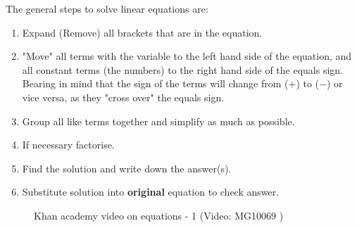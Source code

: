             \label{m39241*id145627}The general steps to solve linear equations are:\par 
        \label{m39241*id145635}\begin{enumerate}[noitemsep, label=\textbf{\arabic*}. ] 
            \label{m39241*uid5}\item  Expand (Remove) all brackets that are in the equation.
\label{m39241*uid6}\item  "Move" all terms with the variable to the left hand side of the equation, and
all constant terms (the numbers) to the right hand side of the equals sign.
Bearing in mind that the sign of the terms will change from ($+$) to ($-$) or vice
versa, as they "cross over" the equals sign.
\label{m39241*uid7}\item Group all like terms together and simplify as much as possible.
\label{m39241*uid8}\item  If necessary factorise.
\label{m39241*uid9}\item  Find the solution and write down the answer(s).
\label{m39241*uid10}\item Substitute solution into \textbf{original} equation to check answer.
\end{enumerate}
\label{m39241*eip-126}
    \setcounter{subfigure}{0}
	\begin{figure}[H] %
    \textnormal{Khan academy video on equations - 1}\vspace{.1in} \nopagebreak
  \label{m39241*yt-media1}\label{m39241*yt-video1}
             { (Video:  MG10069 )}
      \vspace{2pt}
    \vspace{.1in}
 \end{figure}       \par \label{m39241*secfhsst!!!underscore!!!id646}\vspace{.5cm} 
      \noindent
